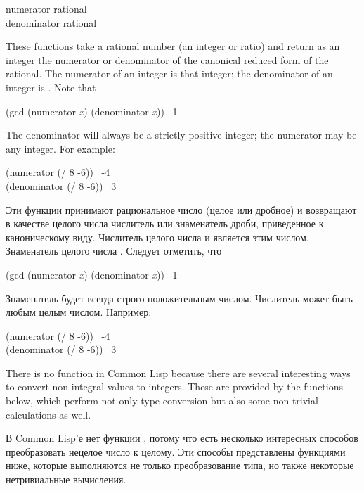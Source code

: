 \begin{defun}[Function]
numerator rational \\
denominator rational

These functions take a rational number (an integer or ratio)
and return as an integer the numerator or denominator of the canonical
reduced form of the rational.  The numerator of an integer is that integer;
the denominator of an integer is .  Note that
\begin{lisp}
(gcd (numerator \emph{x}) (denominator \emph{x})) \EV\ 1
\end{lisp}
The denominator will always be a strictly positive integer;
the numerator may be any integer.
For example:
\begin{lisp}
(numerator (/ 8 -6)) \EV\ -4 \\
(denominator (/ 8 -6)) \EV\ 3
\end{lisp}

Эти функции принимают рациональное число (целое или дробное)
и возвращают в качестве целого числа числитель или знаменатель дроби,
приведенное к каноническому виду. Числитель целого числа и является этим
числом. Знаменатель целого числа . Следует отметить, что
\begin{lisp}
(gcd (numerator \emph{x}) (denominator \emph{x})) \EV\ 1
\end{lisp}
Знаменатель будет всегда строго положительным числом. Числитель может быть любым
целым числом.
Например:
\begin{lisp}
(numerator (/ 8 -6)) \EV\ -4 \\
(denominator (/ 8 -6)) \EV\ 3
\end{lisp}
\end{defun}

There is no  function in Common Lisp because there are several
interesting ways to convert non-integral values to integers.
These are provided by the functions below, which perform not only
type conversion but also some non-trivial calculations as well.

В Common Lisp'е нет функции , потому что есть несколько интересных
способов преобразовать нецелое число к целому.
Эти способы представлены функциями ниже, которые выполняются не только
преобразование типа, но также некоторые нетривиальные вычисления.

